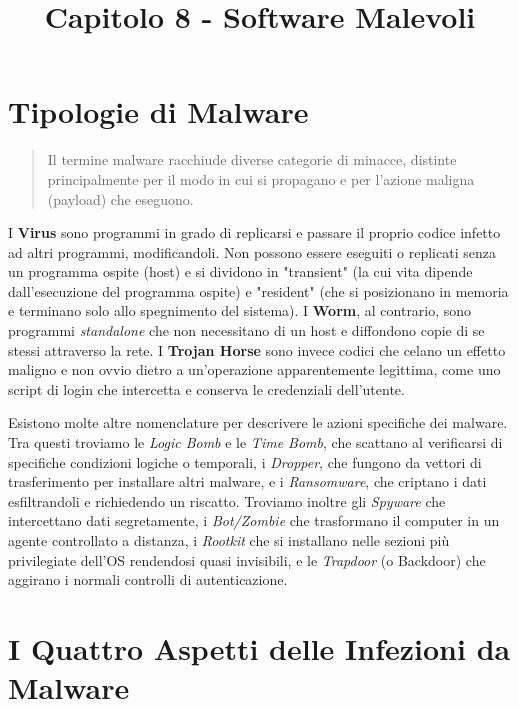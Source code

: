 \documentclass{article}
\title{Capitolo 8 - Software Malevoli}
\author{}
\date{}
\begin{document}
\maketitle

\section*{Tipologie di Malware}

\begin{quote}
    Il termine malware racchiude diverse categorie di minacce, distinte principalmente per il modo in cui si propagano e per l'azione maligna (payload) che eseguono. 
\end{quote}

I \textbf{Virus} sono programmi in grado di replicarsi e passare il proprio codice infetto ad altri programmi, modificandoli. Non possono essere eseguiti o replicati senza un programma ospite (host) e si dividono in "transient" (la cui vita dipende dall'esecuzione del programma ospite) e "resident" (che si posizionano in memoria e terminano solo allo spegnimento del sistema). I \textbf{Worm}, al contrario, sono programmi \textit{standalone} che non necessitano di un host e diffondono copie di se stessi attraverso la rete. I \textbf{Trojan Horse} sono invece codici che celano un effetto maligno e non ovvio dietro a un'operazione apparentemente legittima, come uno script di login che intercetta e conserva le credenziali dell'utente.

Esistono molte altre nomenclature per descrivere le azioni specifiche dei malware. Tra questi troviamo le \textit{Logic Bomb} e le \textit{Time Bomb}, che scattano al verificarsi di specifiche condizioni logiche o temporali, i \textit{Dropper}, che fungono da vettori di trasferimento per installare altri malware, e i \textit{Ransomware}, che criptano i dati esfiltrandoli e richiedendo un riscatto. Troviamo inoltre gli \textit{Spyware} che intercettano dati segretamente, i \textit{Bot/Zombie} che trasformano il computer in un agente controllato a distanza, i \textit{Rootkit} che si installano nelle sezioni più privilegiate dell'OS rendendosi quasi invisibili, e le \textit{Trapdoor} (o Backdoor) che aggirano i normali controlli di autenticazione.

\vspace{0.8cm}

\section*{I Quattro Aspetti delle Infezioni da Malware}
\end{document}
